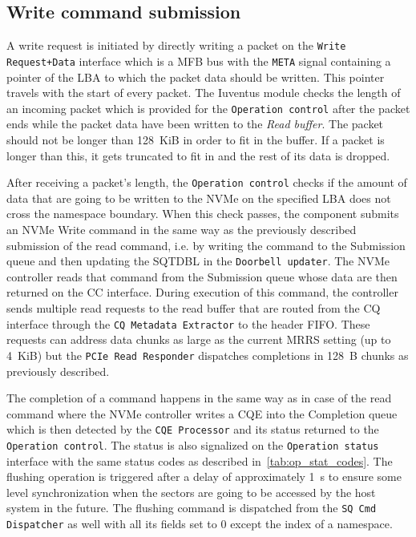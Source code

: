 \subsection{Write command submission}

A write request is initiated by directly writing a packet on the \verb|Write Request+Data| interface
which is a \ac{MFB} bus with the \verb|META| signal containing a pointer of the LBA to which the
packet data should be written. This pointer travels with the start of every packet. The Iuventus
module checks the length of an incoming packet which is provided for the \verb|Operation control|
after the packet ends while the packet data have been written to the \emph{Read buffer}. The packet
should not be longer than 128~KiB in order to fit in the buffer. If a packet is longer than this, it
gets truncated to fit in and the rest of its data is dropped.

After receiving a packet's length, the \verb|Operation control| checks if the amount of data that
are going to be written to the NVMe on the specified \ac{LBA} does not cross the namespace boundary.
When this check passes, the component submits an NVMe Write command in the same way as the previously
described submission of the read command, i.e. by writing the command to the Submission queue and
then updating the \ac{SQTDBL} in the \verb|Doorbell updater|. The NVMe controller reads that command
from the Submission queue whose data are then returned on the \ac{CC} interface. During execution of
this command, the controller sends multiple read requests to the read buffer that are routed from
the CQ interface through the \verb|CQ Metadata Extractor| to the header FIFO. These requests can
address data chunks as large as the current \ac{MRRS} setting (up to 4~KiB) but the
\verb|PCIe Read Responder| dispatches completions in 128~B chunks as previously described.

The completion of a command happens in the same way as in case of the read command where the NVMe
controller writes a \ac{CQE} into the Completion queue which is then detected by the
\verb|CQE Processor| and its status returned to the \verb|Operation control|. The status is also
signalized on the \verb|Operation status| interface with the same status codes as described
in~\cref{tab:op_stat_codes}. The flushing operation is triggered after a delay of approximately 1~s
to ensure some level synchronization when the sectors are going to be accessed by the host system in
the future. The flushing command is dispatched from the \verb|SQ Cmd Dispatcher| as well with all
its fields set to 0 except the index of a namespace.

